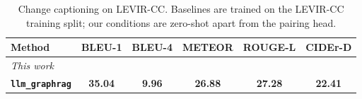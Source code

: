 \begin{table}[t]
\centering
\caption{Change captioning on LEVIR-CC. Baselines are trained on the LEVIR-CC training split; our conditions are zero-shot apart from the pairing head.}
\label{tab:levir_cc_caption}
\setlength{\tabcolsep}{3pt}
\begin{tabular}{lccccc}
\toprule
Method & BLEU-1 & BLEU-4 & METEOR & ROUGE-L & CIDEr-D \\
\midrule
\midrule
\multicolumn{6}{l}{\emph{This work}} \\
\textbf{\texttt{llm\_graphrag}} & \textbf{35.04} & \textbf{9.96} & \textbf{26.88} & \textbf{27.28} & \textbf{22.41} \\
\bottomrule
\end{tabular}
\end{table}
